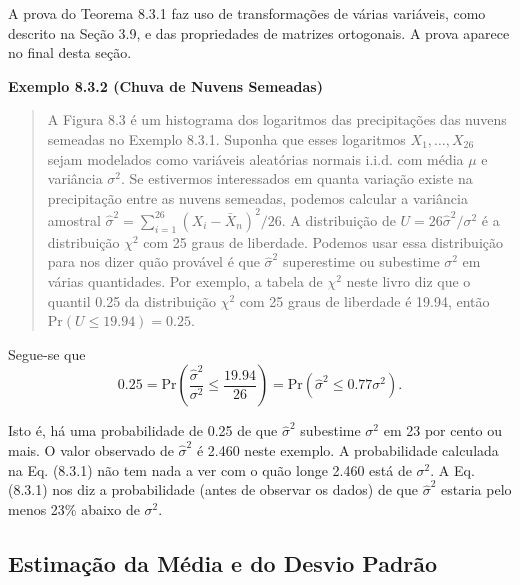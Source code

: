 A prova do Teorema 8.3.1 faz uso de transformações de várias variáveis, como descrito na Seção 3.9, e das propriedades de matrizes ortogonais. A prova aparece no final desta seção.

\vspace{1em}
\noindent\textbf{Exemplo 8.3.2 (Chuva de Nuvens Semeadas)}
\begin{quote}
    A Figura 8.3 é um histograma dos logaritmos das precipitações das nuvens semeadas no Exemplo 8.3.1. Suponha que esses logaritmos $X_1, \dots, X_{26}$ sejam modelados como variáveis aleatórias normais i.i.d. com média $\mu$ e variância $\sigma^2$. Se estivermos interessados em quanta variação existe na precipitação entre as nuvens semeadas, podemos calcular a variância amostral $\hat{\sigma}^2 = \sum_{i=1}^{26}(X_i - \bar{X}_n)^2/26$. A distribuição de $U = 26\hat{\sigma}^2/\sigma^2$ é a distribuição $\chi^2$ com 25 graus de liberdade. Podemos usar essa distribuição para nos dizer quão provável é que $\hat{\sigma}^2$ superestime ou subestime $\sigma^2$ em várias quantidades. Por exemplo, a tabela de $\chi^2$ neste livro diz que o quantil 0.25 da distribuição $\chi^2$ com 25 graus de liberdade é 19.94, então $\text{Pr}(U \le 19.94) = 0.25$.
\end{quote}
\vspace{1em}

Segue-se que
\begin{equation}
    0.25 = \text{Pr}\left(\frac{\hat{\sigma}^2}{\sigma^2} \le \frac{19.94}{26}\right) = \text{Pr}(\hat{\sigma}^2 \le 0.77\sigma^2).
\end{equation}

Isto é, há uma probabilidade de 0.25 de que $\hat{\sigma}^2$ subestime $\sigma^2$ em 23 por cento ou mais. O valor observado de $\hat{\sigma}^2$ é 2.460 neste exemplo. A probabilidade calculada na Eq. (8.3.1) não tem nada a ver com o quão longe 2.460 está de $\sigma^2$. A Eq. (8.3.1) nos diz a probabilidade (antes de observar os dados) de que $\hat{\sigma}^2$ estaria pelo menos 23\% abaixo de $\sigma^2$.

\subsection*{Estimação da Média e do Desvio Padrão}

